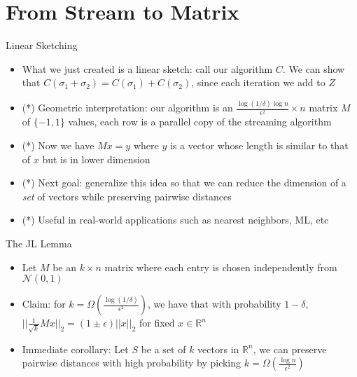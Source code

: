 \documentclass[aspectratio=169]{beamer}
\begin{document}
\section{From Stream to Matrix}

\frame{\sectionpage}

\begin{frame}{Linear Sketching}
\protect\hypertarget{linear-sketching}{}
\begin{itemize}
\tightlist
\item
  What we just created is a linear sketch: call our algorithm \(C\). We
  can show that \(C(\sigma_1 + \sigma_2) = C(\sigma_1) + C(\sigma_2)\),
  since each iteration we add to \(Z\)
\item
  (*) Geometric interpretation: our algorithm is an
  \(\frac{\log(1/\delta)\log n}{\epsilon^2} \times n\) matrix \(M\) of
  \(\{-1,1\}\) values, each row is a parallel copy of the streaming
  algorithm \pause
\item
  (*) Now we have \(Mx = y\) where \(y\) is a vector whose length is similar
  to that of \(x\) but is in lower dimension \pause
\item
  (*) Next goal: generalize this idea so that we can reduce the dimension of
  a \emph{set} of vectors while preserving pairwise distances \pause
\item
  (*) Useful in real-world applications such as nearest neighbors, ML, etc
\end{itemize}
\end{frame}

\begin{frame}{The JL Lemma}
\protect\hypertarget{the-jl-lemma}{}
\begin{itemize}
\tightlist
\item
  Let \(M\) be an \(k \times n\) matrix where each entry is chosen
  independently from \(\mathcal{N}(0,1)\)
\item
  Claim: for
  \(k = \Omega\left(\frac{\log(1/\delta)}{\epsilon^2}\right)\), we have
  that with probability \(1 - \delta\),
  \(||\frac{1}{\sqrt{k}}Mx||_2 = (1 \pm \epsilon)||x||_2\) for fixed
  \(x \in \mathbb{R}^n\) \pause
\item
  Immediate corollary: Let \(S\) be a set of \(k\) vectors in
  \(\mathbb{R}^n\), we can preserve pairwise distances with high
  probability by picking
  \(k = \Omega\left(\frac{\log n}{\epsilon^2}\right)\) \pause
\end{itemize}
\end{frame}
\end{document}
